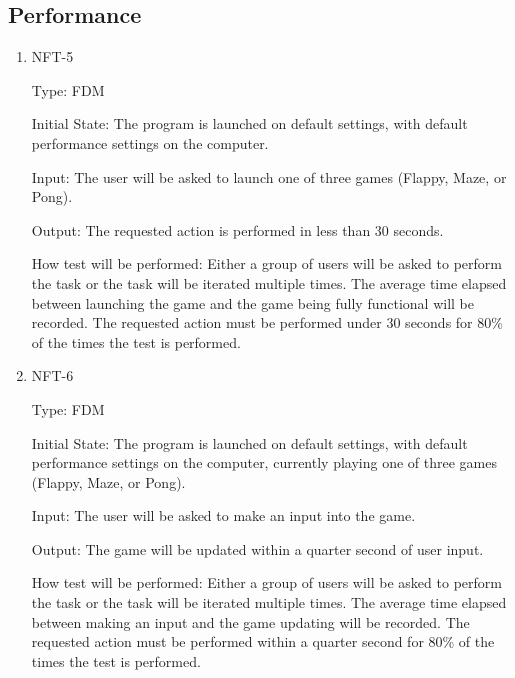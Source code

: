\documentclass[12pt, titlepage]{article}
\begin{document}
\subsection{Performance}
\begin{enumerate}
\item{NFT-5\\}

Type: FDM
					
Initial State: The program is launched on default settings, with default performance settings on the computer. 
					
Input: The user will be asked to launch one of three games (Flappy, Maze, or Pong).
					
Output: The requested action is performed in less than 30 seconds.

How test will be performed: Either a group of users will be asked to perform the task or the task will be iterated multiple times. The average time elapsed between launching the game and the game being fully functional will be recorded. The requested action must be performed under 30 seconds for 80\%  of the times the test is performed.

\item{NFT-6\\}

Type: FDM
					
Initial State: The program is launched on default settings, with default performance settings on the computer, currently playing one of three games (Flappy, Maze, or Pong).
					
Input: The user will be asked to make an input into the game.
					
Output: The game will be updated within a quarter second of user input.

How test will be performed: Either a group of users will be asked to perform the task or the task will be iterated multiple times. The average time elapsed between making an input and the game updating will be recorded. The requested action must be performed within a quarter second for 80\%  of the times the test is performed.
\end{enumerate}
\end{document}

